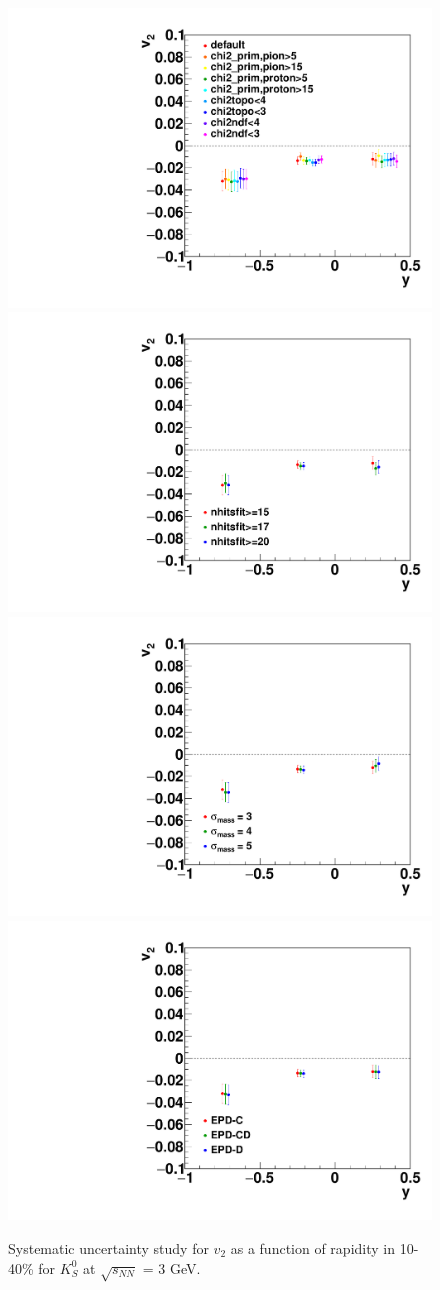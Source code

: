 \begin{figure}[h]
\includegraphics[width=0.49\linewidth]{chapterX/fig/ks_sys_cut_v2.pdf}
\includegraphics[width=0.49\linewidth]{chapterX/fig/ks_sys_cut_v2_nhits.pdf}
\includegraphics[width=0.49\linewidth]{FXT3gev/chapterX/fig/ks_sys_cut_v2_msigma.pdf}
\includegraphics[width=0.49\linewidth]{FXT3gev/chapterX/fig/ks_sys_cut_v2_epdres.pdf}
\caption{Systematic uncertainty study for $v_{2}$ as a function of rapidity in 10-40\% for $K^0_S$ at $\sqrt{s_{NN}}$ = 3 GeV.}
\label{ks_v1y_sys}
\end{figure}




